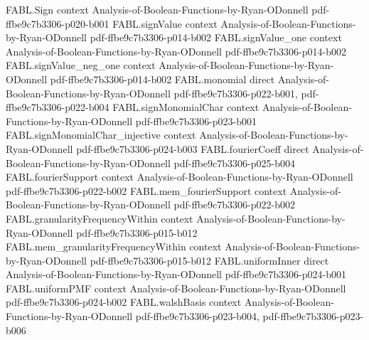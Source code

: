\begin{theorem}
\label{FABL.noiseStability_toReal_eq_agreement_sub_disagreement}
\leanok
{}
\proofstep
  {FABL.Sign}
  {context}
  {Analysis-of-Boolean-Functions-by-Ryan-ODonnell}
  {pdf-ffbe9c7b3306-p020-b001}
\proofstep
  {FABL.signValue}
  {context}
  {Analysis-of-Boolean-Functions-by-Ryan-ODonnell}
  {pdf-ffbe9c7b3306-p014-b002}
\proofstep
  {FABL.signValue_one}
  {context}
  {Analysis-of-Boolean-Functions-by-Ryan-ODonnell}
  {pdf-ffbe9c7b3306-p014-b002}
\proofstep
  {FABL.signValue_neg_one}
  {context}
  {Analysis-of-Boolean-Functions-by-Ryan-ODonnell}
  {pdf-ffbe9c7b3306-p014-b002}
\proofstep
  {FABL.monomial}
  {direct}
  {Analysis-of-Boolean-Functions-by-Ryan-ODonnell}
  {pdf-ffbe9c7b3306-p022-b001,
    pdf-ffbe9c7b3306-p022-b004}
\proofstep
  {FABL.signMonomialChar}
  {context}
  {Analysis-of-Boolean-Functions-by-Ryan-ODonnell}
  {pdf-ffbe9c7b3306-p023-b001}
\proofstep
  {FABL.signMonomialChar_injective}
  {context}
  {Analysis-of-Boolean-Functions-by-Ryan-ODonnell}
  {pdf-ffbe9c7b3306-p024-b003}
\proofstep
  {FABL.fourierCoeff}
  {direct}
  {Analysis-of-Boolean-Functions-by-Ryan-ODonnell}
  {pdf-ffbe9c7b3306-p025-b004}
\proofstep
  {FABL.fourierSupport}
  {context}
  {Analysis-of-Boolean-Functions-by-Ryan-ODonnell}
  {pdf-ffbe9c7b3306-p022-b002}
\proofstep
  {FABL.mem_fourierSupport}
  {context}
  {Analysis-of-Boolean-Functions-by-Ryan-ODonnell}
  {pdf-ffbe9c7b3306-p022-b002}
\proofstep
  {FABL.granularityFrequencyWithin}
  {context}
  {Analysis-of-Boolean-Functions-by-Ryan-ODonnell}
  {pdf-ffbe9c7b3306-p015-b012}
\proofstep
  {FABL.mem_granularityFrequencyWithin}
  {context}
  {Analysis-of-Boolean-Functions-by-Ryan-ODonnell}
  {pdf-ffbe9c7b3306-p015-b012}
\proofstep
  {FABL.uniformInner}
  {direct}
  {Analysis-of-Boolean-Functions-by-Ryan-ODonnell}
  {pdf-ffbe9c7b3306-p024-b001}
\proofstep
  {FABL.uniformPMF}
  {context}
  {Analysis-of-Boolean-Functions-by-Ryan-ODonnell}
  {pdf-ffbe9c7b3306-p024-b002}
\proofstep
  {FABL.walshBasis}
  {context}
  {Analysis-of-Boolean-Functions-by-Ryan-ODonnell}
  {pdf-ffbe9c7b3306-p023-b004,
    pdf-ffbe9c7b3306-p023-b006}
\proofstep

\end{theorem}
